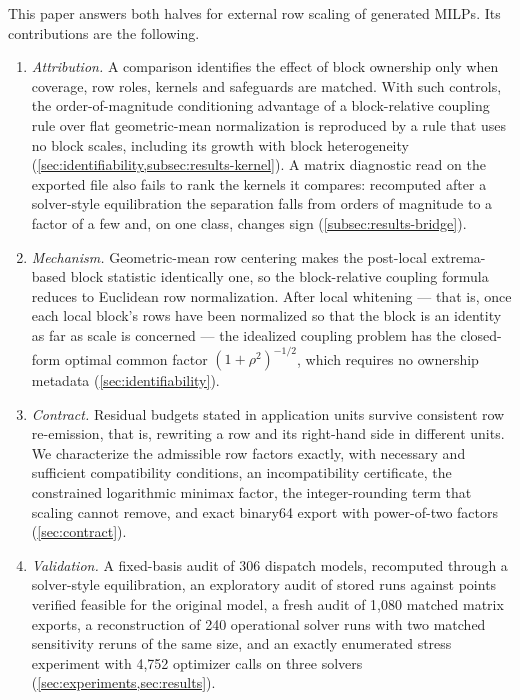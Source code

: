 \documentclass[smallextended,envcountsect,envcountsame]{svjour3}
\begin{document}
This paper answers both halves for external row scaling of generated MILPs. Its contributions
are the following.
\begin{enumerate}[label=(\Alph*),leftmargin=*,itemsep=2pt,topsep=3pt]
\item \emph{Attribution.} A comparison identifies the effect of block ownership only when
coverage, row roles, kernels and safeguards are matched. With such controls, the
order-of-magnitude conditioning advantage of a block-relative coupling rule over flat
geometric-mean normalization is reproduced by a rule that uses no block scales, including its
growth with block heterogeneity (\cref{sec:identifiability,subsec:results-kernel}). A matrix
diagnostic read on the exported file also fails to rank the kernels it compares: recomputed
after a solver-style equilibration the separation falls from orders of magnitude to a factor
of a few and, on one class, changes sign (\cref{subsec:results-bridge}).
\item \emph{Mechanism.} Geometric-mean row centering makes the post-local extrema-based block
statistic identically one, so the block-relative coupling formula reduces to Euclidean row
normalization. After local whitening --- that is, once each local block's rows have been
normalized so that the block is an identity as far as scale is concerned --- the idealized
coupling problem has the closed-form
optimal common factor $(1+\rho^2)^{-1/2}$, which requires no ownership metadata
(\cref{sec:identifiability}).
\item \emph{Contract.} Residual budgets stated in application units survive consistent row
re-emission, that is, rewriting a row and its right-hand side in different units. We characterize the admissible row factors exactly, with necessary and sufficient
compatibility conditions, an incompatibility certificate, the constrained logarithmic minimax
factor, the integer-rounding term that scaling cannot remove, and exact binary64 export with
power-of-two factors (\cref{sec:contract}).
\item \emph{Validation.} A fixed-basis audit of 306 dispatch models, recomputed through a
solver-style equilibration, an exploratory audit of stored runs against points verified feasible
for the original model, a fresh audit of 1,080
matched matrix exports, a reconstruction of 240 operational solver runs with two
matched sensitivity reruns of the same size, and an exactly enumerated stress experiment with
4,752 optimizer calls on three solvers
(\cref{sec:experiments,sec:results}).
\end{enumerate}
\end{document}
